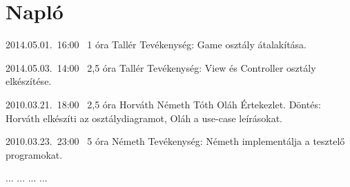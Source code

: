 %
\section{Napló}

\begin{naplo}

\bejegyzes
{2014.05.01.~16:00~}
{1 óra}
{Tallér}
{Tevékenység: Game osztály átalakítása.}

\bejegyzes
{2014.05.03.~14:00~}
{2,5 óra}
{Tallér}
{Tevékenység: View és Controller osztály elkészítése.}


\bejegyzes
{2010.03.21.~18:00~} %
{2,5 óra} %
{Horváth\newline
Németh\newline
Tóth\newline
Oláh} %
{Értekezlet. Döntés: Horváth elkészíti az osztálydiagramot, Oláh a use-case leírásokat.} %

\bejegyzes
{2010.03.23.~23:00~}
{5 óra}
{Németh}
{Tevékenység: Németh implementálja a tesztelő programokat.}

\bejegyzes
{...}
{...}
{...}
{...}


\end{naplo}

